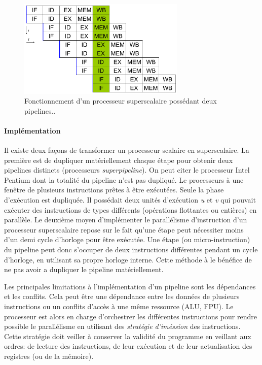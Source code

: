 \begin{figure}
    \center
    \includegraphics[width=8cm]{images/Chapitre1/superscalar.png}
    \caption[Processeur superscalaire]{Fonctionnement d'un processeur superscalaire possédant deux pipelines.\protect\footnotemark. \label{pic_superscalar} }
\end{figure}

\paragraph{Implémentation}
Il existe deux façons de transformer un processeur scalaire en superscalaire. La première est de dupliquer matériellement chaque étape pour obtenir deux pipelines distincts (processeurs \textit{superpipeline}). On peut citer le processeur Intel Pentium dont la totalité du pipeline n'est pas dupliqué. Le processeurs à une fenêtre de plusieurs instructions prêtes à être exécutées. Seule la phase d'exécution est dupliquée.  Il possédait deux unités d'exécution \textit{u} et \textit{v} qui pouvait exécuter des instructions de types différents (opérations flottantes ou entières) en parallèle. 
Le deuxième moyen d'implémenter le parallélisme d'instruction d'un processeur superscalaire repose sur le fait qu'une étape peut nécessiter moins d'un demi cycle d'horloge pour être exécutée. Une étape (ou micro-instruction) du pipeline peut donc s'occuper de deux instructions différentes pendant un cycle d'horloge, en utilisant sa propre horloge interne. Cette méthode à le bénéfice de ne pas avoir a dupliquer le pipeline matériellement. 

Les principales limitations à l'implémentation d'un pipeline sont les dépendances et les conflits. Cela peut être une dépendance entre les données de plusieurs instructions ou un conflits d'accès à une même ressource (ALU, FPU). Le processeur est alors en charge d'orchestrer les différentes instructions pour rendre possible le parallélisme en utilisant des \textit{stratégie d'iméssion} \cite{johnson1989super} des instructions. Cette stratégie doit veiller à conserver la validité du programme en veillant aux ordres: de lecture des instructions, de leur exécution et de leur actualisation des registres (ou de la mémoire). 


